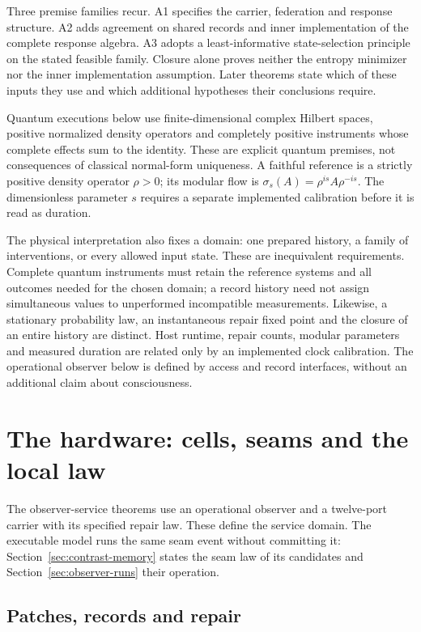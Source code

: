 \documentclass[11pt]{article}
\theoremstyle{definition}
\theoremstyle{remark}
\begin{document}
Three premise families recur. A1 specifies the carrier, federation and
response structure. A2 adds agreement on shared records and inner
implementation of the complete response algebra. A3 adopts a
least-informative state-selection principle on the stated feasible family.
Closure alone proves neither the entropy minimizer nor the inner
implementation assumption. Later theorems state which of these inputs
they use and which additional hypotheses their conclusions require.

Quantum executions below use finite-dimensional complex Hilbert spaces,
positive normalized density operators and completely positive instruments
whose complete effects sum to the identity. These are explicit quantum
premises, not consequences of classical normal-form uniqueness. A faithful
reference is a strictly positive density operator $\rho>0$; its modular
flow is $\sigma_s(A)=\rho^{is}A\rho^{-is}$. The dimensionless parameter $s$
requires a separate implemented calibration before it is read as duration.

The physical interpretation also fixes a domain: one prepared history,
a family of interventions, or every allowed input state. These are
inequivalent requirements. Complete quantum instruments must retain the
reference systems and all outcomes needed for the chosen domain; a record
history need not assign simultaneous values to unperformed incompatible
measurements. Likewise, a stationary probability law, an instantaneous
repair fixed point and the closure of an entire history are distinct.
Host runtime, repair counts, modular parameters and measured duration are
related only by an implemented clock calibration. The operational observer
below is defined by access and record interfaces, without an additional
claim about consciousness.

\section{The hardware: cells, seams and the local law}
\label{sec:architecture}

The observer-service theorems use an operational observer and a twelve-port
carrier with its specified repair law. These define the service domain.
The executable model runs the same seam event without committing it:
Section~\ref{sec:contrast-memory} states the seam law of its candidates and
Section~\ref{sec:observer-runs} their operation.

\subsection{Patches, records and repair}
\end{document}
